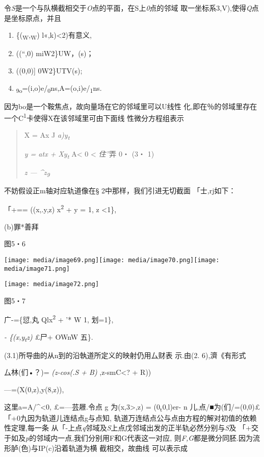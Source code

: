 \documentclass{article}
\begin{document}
令\emph{S}是一个与队横截相交于\emph{O}点的平面，在S上\emph{0}点的邻域
取一坐标系3,V),使得\emph{Q}点是坐标原点，并且

\begin{enumerate}
\def\labelenumi{(\arabic{enumi})}
\item
  \{(\textsubscript{W},\textsubscript{W})\textbar{}
  l«\textbar{},k)\textless{}2)有意义,
\item
  ((``,0)\textbar{} miW2\}UW，(s)；
\item
  ((0,0){]} \textbar{}0\textbar{}W2\}UTV(s);
\item
  \textsubscript{9o}=(i,o)e/\textsubscript{0}ns,A=(o,i)e/\textsubscript{1}ns.
\end{enumerate}

因为bo是一个鞍焦点，故向量场在它的邻域里可以U线性
化,即在％的邻域里存在一个C\textsuperscript{1}卡使得X在该邻域里可由下面线
性微分方程组表示

\begin{quote}
X = Ax J \emph{a)y\textsubscript{t}}

\emph{y = atx + Xy\textsubscript{t}} A\textless{} 0 \textless{}
\emph{住''}弄 0・ (3・ 1)

\emph{z --- \^{}z\textsubscript{9}}
\end{quote}

不妨假设正m轴对应轨道像在§ 2中那样，我们引进无切截面 「士,rj如下：

「+== ((x,.y,z) \textbar{}x\textsuperscript{2} + y = 1,
\textbar{}z\textbar{} \textless{}1\},

(b)罪*善拜

图5・6

\texttt{[image: media/image69.png]}\texttt{[image: media/image70.png]}\texttt{[image: media/image71.png]}

\texttt{[image: media/image72.png]}

图5・7

广-=\{愆,丸 Qlx\textsuperscript{2} + '* W 1, \textbar{}划=1\},

\emph{- \{(x,y\textsubscript{t}z)} £尸+ \textbar{}OWnW 五\}.

(3.1)所导曲的从n到的沿執道所定义的映射仍用厶财表 示.由(2. 6),濟《有形式

厶林(们•？)= \emph{(z-cos(.S + B)} ,z-smC\textless{}? + R))

---=(X(0,z),y(8,z)),

这里a=A/\^{}\textless{}0, £=---芸屜.令点 g 为(x,3\textgreater{},z) =
(0\textsubscript{t}0,l)er- n
儿,点/■为(们/=(0,0)£「+0九因为轨道儿连结点g与点知,
轨道万连结点公与点由方程的解对初值的依赖性定理,每一条
从「-上点\emph{q}邻域及\emph{S}上点戊邻域出发的正半轨必然分别与\emph{S}及
「+交于如及\emph{p}的邻域内一点,我们分别用F和G代表这一对应,
则\emph{F,G}都是微分同胚.因为流形胪(色)与IP(c)沿着轨道为横
截相交，故曲线 可以表示成
\end{document}
